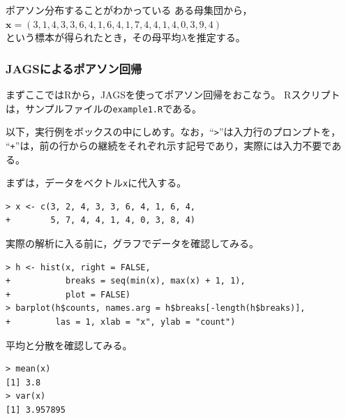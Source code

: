 \documentclass[11pt,uplatex]{jsarticle}
\begin{document}
\hspace{18mm}
\begin{minipage}{100mm}
\begin{breakbox}
ポアソン分布することがわかっている ある母集団から，\\
\hspace{10mm} $\bm{x} = (3, 1, 4, 3, 3, 6, 4, 1, 6, 4, 
       1, 7, 4, 4, 1, 4, 0, 3, 9, 4)$\\
という標本が得られたとき，その母平均$\lambda$を推定する。
\end{breakbox}
\end{minipage}

\vspace{1zw}

\subsubsection{JAGSによるポアソン回帰}

まずここでは\textsf{R}から，\textsf{JAGS}を使ってポアソン回帰をおこなう。
\textsf{R}スクリプトは，サンプルファイルの\texttt{example1.R}である。
\vspace{1zw}

以下，実行例をボックスの中にしめす。なお，``\texttt{>}''は入力行のプロンプトを，
``\texttt{+}''は，前の行からの継続をそれぞれ示す記号であり，実際には入力不要である。

まずは，データをベクトル\texttt{x}に代入する。
\begin{lstlisting}
> x <- c(3, 2, 4, 3, 3, 6, 4, 1, 6, 4,
+        5, 7, 4, 4, 1, 4, 0, 3, 8, 4)
\end{lstlisting}

実際の解析に入る前に，グラフでデータを確認してみる。
\begin{lstlisting}
> h <- hist(x, right = FALSE,
+           breaks = seq(min(x), max(x) + 1, 1),
+           plot = FALSE)
> barplot(h$counts, names.arg = h$breaks[-length(h$breaks)],
+         las = 1, xlab = "x", ylab = "count")
\end{lstlisting}

平均と分散を確認してみる。
\begin{lstlisting}
> mean(x)
[1] 3.8
> var(x)
[1] 3.957895
\end{lstlisting}
\end{document}
